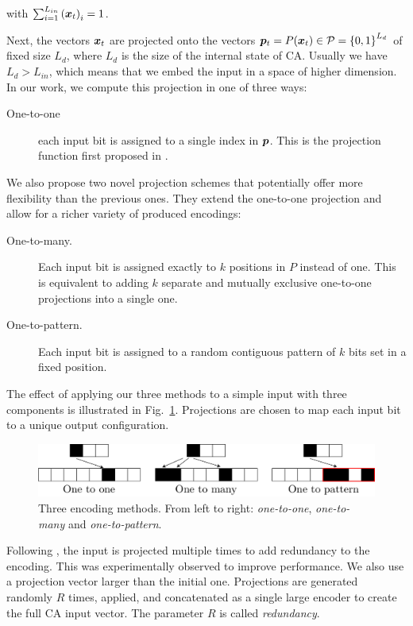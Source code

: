 with
$\sum_{i = 1}^{L_{in}}{({\bm{x}}_{t})}_{i} = 1$.

Next, the vectors ${\bm{x}}_{t}$ are projected onto the vectors
${\bm{p}}_{t} = P({\bm{x}}_{t}) \in \mathcal{P} = {\{0, 1\}}^{L_{d}}$ of fixed size $L_{d}$, where
$L_{d}$ is the size of the internal state of \ac{CA}. Usually we have
$L_{d} > L_{in}$, which means that we embed the input in a space of higher
dimension. In our work, we compute this projection in one of three ways:

\begin{description}
  \item[One-to-one] each input bit is assigned to a single index in ${\bm{p}}$.
        This is the projection function first proposed in
        \textcite{yilmazReservoirComputingUsing2014}.
\end{description}

We also propose two novel projection schemes that potentially offer more
flexibility than the previous ones. They extend the one-to-one projection and
allow for a richer variety of produced encodings:

\begin{description}
  \item[One-to-many.] Each input bit is assigned exactly to $k$ positions in $P$
        instead of one. This is equivalent to adding $k$ separate and mutually
        exclusive one-to-one projections into a single one.
  \item[One-to-pattern.] Each input bit is assigned to a random contiguous pattern
        of $k$ bits set in a fixed position.
\end{description}

The effect of applying our three methods to a simple input with three components
is illustrated in Fig.~\ref{fig:enc_meth}. Projections are chosen to map
each input bit to a unique output configuration.

\begin{figure}[htbp]
  \centering
  \includegraphics[width=\linewidth]{figures/encoding_methods.pdf}
  \caption{Three encoding methods. From left to right: \emph{one-to-one},
    \emph{one-to-many} and \emph{one-to-pattern}.}\label{fig:enc_meth}
\end{figure}

Following \parencite{yilmazReservoirComputingUsing2014,
  nicheleReservoirComputingUsing2017, nicheleDeepLearningCellular2017}, the
input is projected multiple times to add redundancy to the encoding. This was
experimentally observed to improve performance. We also use a projection vector
larger than the initial one. Projections are generated randomly $R$ times, applied, and concatenated as a single large encoder to create the full \ac{CA} input
vector. The parameter $R$ is called \emph{redundancy}.

